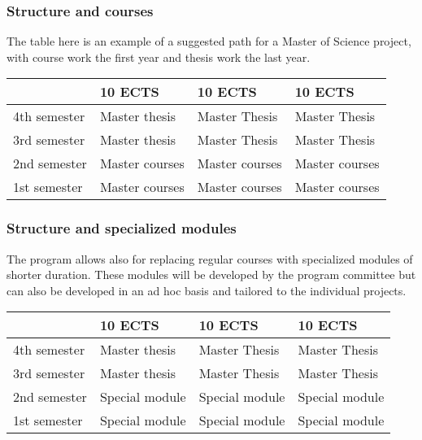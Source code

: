 \documentclass{beamer}
\begin{document}
\begin{frame}
\frametitle{Structure and courses}

\begin{block}{}
The table here is an example of a suggested path for a Master of Science project,
with course work the first year and thesis work the last year.


{\footnotesize
\begin{tabular}{llll}
\hline
\multicolumn{1}{l}{  } & \multicolumn{1}{l}{ 10 ECTS } & \multicolumn{1}{l}{ 10 ECTS } & \multicolumn{1}{l}{ 10 ECTS } \\
\hline
4th semester & Master thesis  & Master Thesis  & Master Thesis  \\
\hline
3rd semester & Master thesis  & Master Thesis  & Master Thesis  \\
\hline
2nd semester & Master courses & Master courses & Master courses \\
\hline
1st semester & Master courses & Master courses & Master courses \\
\hline
\end{tabular}
}

\noindent
\end{block}
\end{frame}

\begin{frame}
\frametitle{Structure and specialized modules}

\begin{block}{}
The program allows also for replacing regular courses with specialized modules of shorter duration.
These modules will be developed by the program committee but can also be developed in an ad hoc basis
and tailored to the individual projects. 



{\footnotesize
\begin{tabular}{llll}
\hline
\multicolumn{1}{l}{  } & \multicolumn{1}{l}{ 10 ECTS } & \multicolumn{1}{l}{ 10 ECTS } & \multicolumn{1}{l}{ 10 ECTS } \\
\hline
4th semester & Master thesis  & Master Thesis  & Master Thesis  \\
\hline
3rd semester & Master thesis  & Master Thesis  & Master Thesis  \\
\hline
2nd semester & Special module & Special module & Special module \\
\hline
1st semester & Special module & Special module & Special module \\
\hline
\end{tabular}
}

\noindent
\end{block}
\end{frame}
\end{document}

